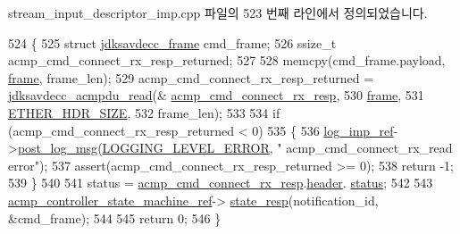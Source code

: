 stream\+\_\+input\+\_\+descriptor\+\_\+imp.\+cpp 파일의 523 번째 라인에서 정의되었습니다.


\begin{DoxyCode}
524 \{
525     \textcolor{keyword}{struct }\hyperlink{structjdksavdecc__frame}{jdksavdecc\_frame} cmd\_frame;
526     ssize\_t acmp\_cmd\_connect\_rx\_resp\_returned;
527 
528     memcpy(cmd\_frame.payload, \hyperlink{gst__avb__playbin_8c_ac8e710e0b5e994c0545d75d69868c6f0}{frame}, frame\_len);
529     acmp\_cmd\_connect\_rx\_resp\_returned = \hyperlink{group__acmpdu_gaf49dbf727e31865dd891330cbdeeabc2}{jdksavdecc\_acmpdu\_read}(&
      \hyperlink{classavdecc__lib_1_1stream__input__descriptor__imp_a561a3829d1cc67d85b732a62cba7fcf0}{acmp\_cmd\_connect\_rx\_resp},
530                                                                \hyperlink{gst__avb__playbin_8c_ac8e710e0b5e994c0545d75d69868c6f0}{frame},
531                                                                \hyperlink{namespaceavdecc__lib_a6c827b1a0d973e18119c5e3da518e65ca9512ad9b34302ba7048d88197e0a2dc0}{ETHER\_HDR\_SIZE},
532                                                                frame\_len);
533 
534     \textcolor{keywordflow}{if} (acmp\_cmd\_connect\_rx\_resp\_returned < 0)
535     \{
536         \hyperlink{namespaceavdecc__lib_acbe3e2a96ae6524943ca532c87a28529}{log\_imp\_ref}->\hyperlink{classavdecc__lib_1_1log_a68139a6297697e4ccebf36ccfd02e44a}{post\_log\_msg}(\hyperlink{namespaceavdecc__lib_a501055c431e6872ef46f252ad13f85cdaf2c4481208273451a6f5c7bb9770ec8a}{LOGGING\_LEVEL\_ERROR}, \textcolor{stringliteral}{"
      acmp\_cmd\_connect\_rx\_read error"});
537         assert(acmp\_cmd\_connect\_rx\_resp\_returned >= 0);
538         \textcolor{keywordflow}{return} -1;
539     \}
540 
541     status = \hyperlink{classavdecc__lib_1_1stream__input__descriptor__imp_a561a3829d1cc67d85b732a62cba7fcf0}{acmp\_cmd\_connect\_rx\_resp}.\hyperlink{structjdksavdecc__acmpdu_a2c237e845db12511d3ddd73770461bed}{header}.
      \hyperlink{structjdksavdecc__acmpdu__common__control__header_ade20423e91627f07e610924cb0081623}{status};
542 
543     \hyperlink{namespaceavdecc__lib_a693c2049de1d4ec860a92126b846ac21}{acmp\_controller\_state\_machine\_ref}->
      \hyperlink{classavdecc__lib_1_1acmp__controller__state__machine_affdd2e72c0e7a518e4b8993e23750aa9}{state\_resp}(notification\_id, &cmd\_frame);
544 
545     \textcolor{keywordflow}{return} 0;
546 \}
\end{DoxyCode}


